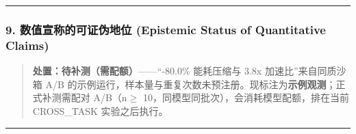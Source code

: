 \begin{Shaded}
\begin{Highlighting}[]
      \OperatorTok{=}  \NormalTok{)}\OperatorTok{;}

\NormalTok{(\{}
\OperatorTok{:}\OperatorTok{,}
\OperatorTok{:}\OperatorTok{,}
\OperatorTok{:}\OperatorTok{,}
\OperatorTok{:}\OperatorTok{,}
\OperatorTok{:}
\NormalTok{      \})}\OperatorTok{;}
\NormalTok{    \}}

     \OperatorTok{;}
\NormalTok{  \}}
\NormalTok{\}}
\end{Highlighting}
\end{Shaded}

\begin{center}\rule{0.5\linewidth}{0.5pt}\end{center}

\subsubsection{9. 数值宣称的可证伪地位 (Epistemic Status of Quantitative
Claims)}\label{ux6570ux503cux5ba3ux79f0ux7684ux53efux8bc1ux4f2aux5730ux4f4d-epistemic-status-of-quantitative-claims-5}

\begin{quote}
\textbf{处置：待补测（需配额）}------``-80.0\% 能耗压缩与 3.8x
加速比''来自同质沙箱 A/B
的示例运行，样本量与重复次数未预注册。现标注为\textbf{示例观测}；正式补测需配对
A/B（n\(\ge\) 10，同模型同批次），会消耗模型配额，排在当前 CROSS\_TASK
实验之后执行。
\end{quote}

\begin{center}\rule{0.5\linewidth}{0.5pt}\end{center}

